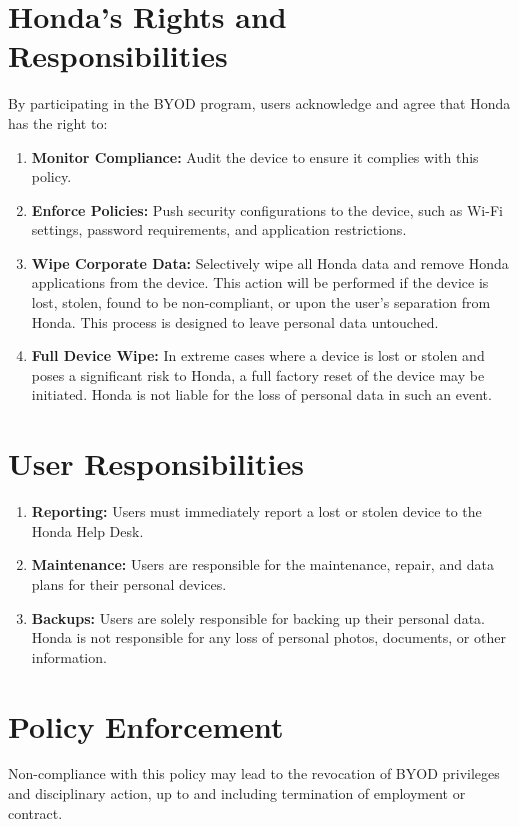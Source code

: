 \section{Honda's Rights and Responsibilities}
By participating in the BYOD program, users acknowledge and agree that Honda has the right to:
\begin{enumerate}
    \item \textbf{Monitor Compliance:} Audit the device to ensure it complies with this policy.
    \item \textbf{Enforce Policies:} Push security configurations to the device, such as Wi-Fi settings, password requirements, and application restrictions.
    \item \textbf{Wipe Corporate Data:} Selectively wipe all Honda data and remove Honda applications from the device.  This action will be performed if the device is lost, stolen, found to be non-compliant, or upon the user's separation from Honda. This process is designed to leave personal data untouched.
    \item \textbf{Full Device Wipe:} In extreme cases where a device is lost or stolen and poses a significant risk to Honda, a full factory reset of the device may be initiated.  Honda is not liable for the loss of personal data in such an event.
\end{enumerate}
\section{User Responsibilities}
\begin{enumerate}
    \item \textbf{Reporting:} Users must immediately report a lost or stolen device to the Honda Help Desk.
    \item \textbf{Maintenance:} Users are responsible for the maintenance, repair, and data plans for their personal devices.
    \item \textbf{Backups:} Users are solely responsible for backing up their personal data. Honda is not responsible for any loss of personal photos, documents, or other information.
\end{enumerate}
\section{Policy Enforcement} Non-compliance with this policy may lead to the revocation of BYOD privileges and disciplinary action, up to and including termination of employment or contract.
